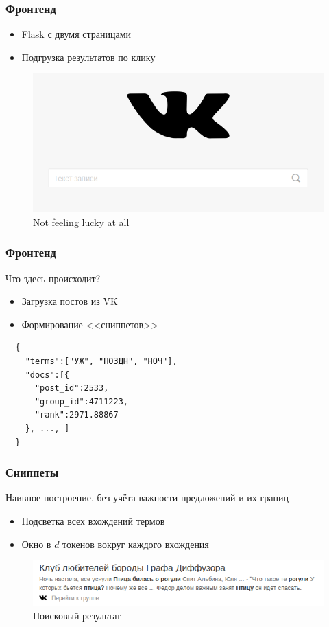 \documentclass{beamer}
\begin{document}
\begin{frame}
  \frametitle{Фронтенд}
        \begin{itemize}
      \item Flask с двумя страницами
      \item Подгрузка результатов по клику
    \end{itemize}
    
    \begin{figure}[!htb]
      \centering
      \includegraphics[scale=0.35]{pics/frontend.png}
      \caption{Not feeling lucky at all}
      \label{fig:frontend}
    \end{figure}
\end{frame}

\begin{frame}[fragile]
  \frametitle{Фронтенд}
    Что здесь происходит?
    \begin{itemize}
      \item Загрузка постов из VK
      \item Формирование <<сниппетов>>
    \end{itemize}

\begin{verbatim}
  {
    "terms":["УЖ", "ПОЗДН", "НОЧ"],
    "docs":[{
      "post_id":2533,
      "group_id":4711223,
      "rank":2971.88867
    }, ..., ]
  }
\end{verbatim}

\end{frame}

\begin{frame}
  \frametitle{Сниппеты}
    Наивное построение, без учёта важности предложений и их границ
    \begin{itemize}
      \item Подсветка всех вхождений термов
      \item Окно в $d$ токенов вокруг каждого вхождения
    \end{itemize}

    \begin{figure}[!htb]
      \centering
      \includegraphics[scale=0.45]{pics/search_result.png}
      \caption{Поисковый результат}
      \label{fig:search_result}
    \end{figure}
\end{frame}
\end{document}
